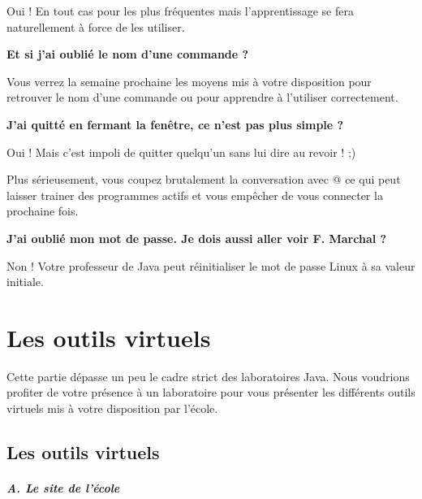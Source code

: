 \documentclass[11pt,a4paper]{article}
\begin{document}
					Oui ! En tout cas pour les plus fr\'equentes mais l'apprentissage se fera naturellement \`a force de les utiliser.
				
            \par
        \textbf{Et si j'ai oubli\'e le nom d'une commande ?}
            \par
         
					Vous verrez la semaine prochaine les moyens mis \`a votre disposition pour retrouver le nom d'une commande ou pour apprendre \`a l'utiliser correctement.
				
            \par
        \textbf{J'ai quitt\'e en fermant la fen\^etre, ce n'est pas plus simple ?}
            \par
        
					Oui ! Mais c'est impoli de quitter quelqu'un sans lui dire au revoir ! ;) 
        
            \par
        
					Plus s\'erieusement, vous coupez brutalement la conversation avec @
					ce qui peut laisser trainer des programmes actifs et vous emp\^echer de vous connecter la prochaine fois.
				
            \par
        \textbf{J'ai oubli\'e mon mot de passe. Je dois aussi aller voir F. Marchal ?}
            \par
        
					Non ! Votre professeur de Java peut r\'einitialiser le mot de passe Linux \`a sa valeur initiale.
				
            \par
        \section{Les outils virtuels}
				Cette partie d\'epasse un peu le cadre strict
				des laboratoires Java.
				Nous voudrions profiter de votre pr\'esence
				\`a un laboratoire pour vous pr\'esenter
				les diff\'erents outils virtuels
				mis \`a votre disposition par l'\'ecole.
			
            \par
        \subsection{Les outils virtuels}
			
		\subparagraph{A. Le site de l'\'ecole} 
		
\end{document}
